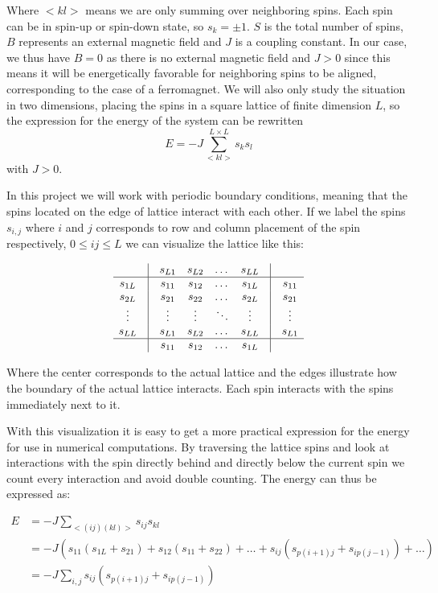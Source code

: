 \documentclass[english, 12pt]{article}
\begin{document}
Where $<kl>$ means we are only summing over neighboring spins. Each spin can be in spin-up or spin-down state, so $s_k=\pm1$. $S$ is the total number of spins, $B$ represents an external magnetic field and $J$ is a coupling constant. In our case, we thus have $B=0$ as there is no external magnetic field and $J>0$ since this means it will be energetically favorable for neighboring spins to be aligned, corresponding to the case of a ferromagnet. We will also only study the situation in two dimensions, placing the spins in a square lattice of finite dimension $L$, so the expression for the energy of the system can be rewritten
$$E = -J\sum\limits_{<kl>}^{L\times L}s_ks_l$$ with $J>0$.

In this project we will work with periodic boundary conditions, meaning that the spins located on the edge of lattice interact with each other. If we label the spins $s_{i,j}$ where $i$ and $j$ corresponds to row and column placement of the spin respectively, $0\leq ij\leq L$ we can visualize the lattice like this:

$$\begin{matrix} & \vline &  s_{L1}  & s_{L2} & \dots & s_{LL}& \vline & \\ \hline
s_{1L} & \vline & s_{11} & s_{12} & \dots & s_{1L}& \vline & s_{11}\\
s_{2L} & \vline & s_{21} & s_{22} & \dots & s_{2L} & \vline & s_{21} \\
\vdots & \vline & \vdots & \vdots & \ddots & \vdots & \vline & \vdots \\
s_{LL} & \vline & s_{L1} & s_{L2} & \dots & s_{LL}& \vline & s_{L1} \\ \hline
 & \vline & s_{11} & s_{12} & \dots & s_{1L} & \vline & \end{matrix}$$

Where the center corresponds to the actual lattice and the edges illustrate how the boundary of the actual lattice interacts. Each spin interacts with the spins immediately next to it.

With this visualization it is easy to get a more practical expression for the energy for use in numerical computations. By traversing the lattice spins and look at interactions with the spin directly behind and directly below the current spin we count every interaction and avoid double counting. The energy can thus be expressed as:

\begin{align*}
 E &= -J\sum\limits_{<(ij)(kl)>}s_{ij}s_{kl}\\
 &= -J\left(s_{11}(s_{1L}+s_{21}) + s_{12}(s_{11}+s_{22}) + \dots +s_{ij}(s_{p(i+1)j} +s_{ip(j-1)})+\dots\right) \\
 &= -J\sum\limits_{i,j} s_{ij}(s_{p(i+1)j} +s_{ip(j-1)})
\end{align*}
\end{document}
